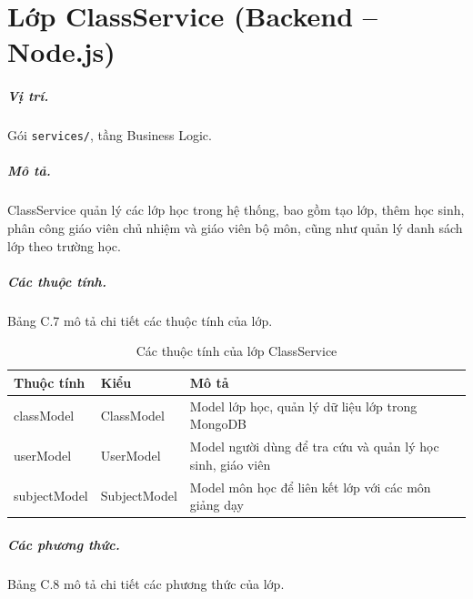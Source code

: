\documentclass[../DoAn.tex]{subfiles}
\begin{document}
\vspace{0.3cm}

\section{Lớp ClassService (Backend -- Node.js)}
\label{appendix:class_service}

\subparagraph{Vị trí.} Gói \texttt{services/}, tầng Business Logic.

\subparagraph{Mô tả.} ClassService quản lý các lớp học trong hệ thống, bao gồm tạo lớp, thêm học sinh, phân công giáo viên chủ nhiệm và giáo viên bộ môn, cũng như quản lý danh sách lớp theo trường học.

\subparagraph{Các thuộc tính.} Bảng C.7 mô tả chi tiết các thuộc tính của lớp.

\begin{table}[H]
\centering
\begin{tabular}{|p{4cm}|p{3.5cm}|p{5cm}|}
\hline
\textbf{Thuộc tính} & \textbf{Kiểu} & \textbf{Mô tả} \\ \hline
classModel & ClassModel & Model lớp học, quản lý dữ liệu lớp trong MongoDB \\ \hline
userModel & UserModel & Model người dùng để tra cứu và quản lý học sinh, giáo viên \\ \hline
subjectModel & SubjectModel & Model môn học để liên kết lớp với các môn giảng dạy \\ \hline
\end{tabular}
\caption{Các thuộc tính của lớp ClassService}
\label{table:class_service_attrs}
\end{table}

\subparagraph{Các phương thức.} Bảng C.8 mô tả chi tiết các phương thức của lớp.
\end{document}
